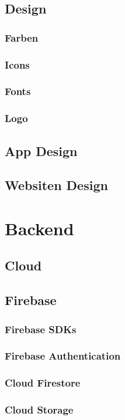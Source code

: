 \subsection{Design}
\subsubsection{Farben}
\subsubsection{Icons}
\subsubsection{Fonts}
\subsubsection{Logo}
\subsection{App Design}
\subsection{Websiten Design}

\section{Backend}
\subsection{Cloud}
\subsection{Firebase}
\subsubsection{Firebase SDKs}

\subsubsection{Firebase Authentication}


\subsubsection{Cloud Firestore}
\subsubsection{Cloud Storage}
